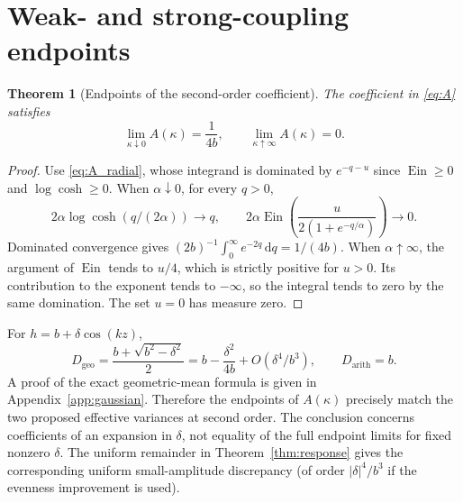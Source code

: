 \documentclass[11pt]{article}
\numberwithin{equation}{section}
\newtheorem{theorem}{Theorem}[section]
\theoremstyle{definition}
\theoremstyle{remark}
\newcommand{\dd}{\,\mathrm d}
\newcommand{\Geo}{D_{\mathrm{geo}}}
\newcommand{\Arith}{D_{\mathrm{arith}}}
\newcommand{\Ein}{\operatorname{Ein}}
\begin{document}
\section{Weak- and strong-coupling endpoints}\label{sec:endpoints}
\begin{theorem}[Endpoints of the second-order coefficient]\label{thm:endpoints}
The coefficient in \eqref{eq:A} satisfies
\[
 \boxed{\lim_{\kappa\downarrow0}A(\kappa)=\frac1{4b},\qquad
 \lim_{\kappa\uparrow\infty}A(\kappa)=0.}
\]
\end{theorem}
\begin{proof}
Use \eqref{eq:A_radial}, whose integrand is dominated by $e^{-q-u}$ since $\Ein\ge0$ and $\log\cosh\ge0$. When $\alpha\downarrow0$, for every $q>0$,
\[
 2\alpha\log\cosh(q/(2\alpha))\to q,
 \qquad 2\alpha\Ein\!\left(\frac{u}{2(1+e^{-q/\alpha})}\right)\to0.
\]
Dominated convergence gives $(2b)^{-1}\int_0^\infty e^{-2q}\dd q=1/(4b)$. When $\alpha\uparrow\infty$, the argument of $\Ein$ tends to $u/4$, which is strictly positive for $u>0$. Its contribution to the exponent tends to $-\infty$, so the integral tends to zero by the same domination. The set $u=0$ has measure zero.
\end{proof}
For $h=b+\delta\cos(kz)$,
\begin{equation}\label{eq:geoexplicit}
 \Geo=\frac{b+\sqrt{b^2-\delta^2}}2=b-\frac{\delta^2}{4b}+O(\delta^4/b^3),\qquad \Arith=b.
\end{equation}
A proof of the exact geometric-mean formula is given in Appendix~\ref{app:gaussian}. Therefore the endpoints of $A(\kappa)$ precisely match the two proposed effective variances at second order. The conclusion concerns coefficients of an expansion in $\delta$, not equality of the full endpoint limits for fixed nonzero $\delta$. The uniform remainder in Theorem~\ref{thm:response} gives the corresponding uniform small-amplitude discrepancy (of order $|\delta|^4/b^3$ if the evenness improvement is used).
\end{document}
